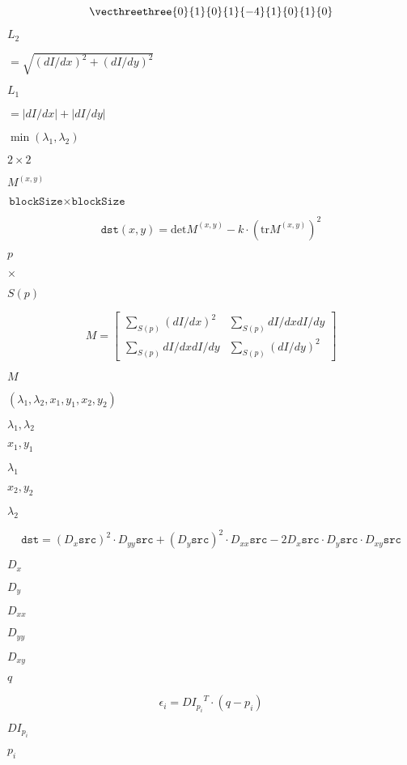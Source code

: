 \documentclass{article}
\begin{document}
\[\vecthreethree {0}{1}{0}{1}{-4}{1}{0}{1}{0}\]
\pagebreak

$L_2$
\pagebreak

$=\sqrt{(dI/dx)^2 + (dI/dy)^2}$
\pagebreak

$L_1$
\pagebreak

$=|dI/dx|+|dI/dy|$
\pagebreak

$\min(\lambda_1, \lambda_2)$
\pagebreak

$2\times2$
\pagebreak

$M^{(x,y)}$
\pagebreak

$\texttt{blockSize} \times \texttt{blockSize}$
\pagebreak

\[\texttt{dst} (x,y) = \mathrm{det} M^{(x,y)} - k \cdot \left ( \mathrm{tr} M^{(x,y)} \right )^2\]
\pagebreak

$p$
\pagebreak

$\times$
\pagebreak

$S(p)$
\pagebreak

\[M = \begin{bmatrix} \sum _{S(p)}(dI/dx)^2 & \sum _{S(p)}dI/dx dI/dy \\ \sum _{S(p)}dI/dx dI/dy & \sum _{S(p)}(dI/dy)^2 \end{bmatrix}\]
\pagebreak

$M$
\pagebreak

$(\lambda_1, \lambda_2, x_1, y_1, x_2, y_2)$
\pagebreak

$\lambda_1, \lambda_2$
\pagebreak

$x_1, y_1$
\pagebreak

$\lambda_1$
\pagebreak

$x_2, y_2$
\pagebreak

$\lambda_2$
\pagebreak

\[\texttt{dst} = (D_x \texttt{src} )^2 \cdot D_{yy} \texttt{src} + (D_y \texttt{src} )^2 \cdot D_{xx} \texttt{src} - 2 D_x \texttt{src} \cdot D_y \texttt{src} \cdot D_{xy} \texttt{src}\]
\pagebreak

$D_x$
\pagebreak

$D_y$
\pagebreak

$D_{xx}$
\pagebreak

$D_{yy}$
\pagebreak

$D_{xy}$
\pagebreak

$q$
\pagebreak

\[\epsilon _i = {DI_{p_i}}^T \cdot (q - p_i)\]
\pagebreak

${DI_{p_i}}$
\pagebreak

$p_i$
\pagebreak
\end{document}
